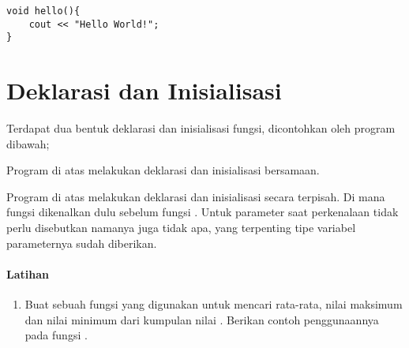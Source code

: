 \documentclass[../main.tex]{subfiles}
\begin{document}
\begin{verbatim}
void hello(){
	cout << "Hello World!";
}
\end{verbatim}

\section{Deklarasi dan Inisialisasi}
Terdapat dua bentuk deklarasi dan inisialisasi fungsi, dicontohkan oleh program
dibawah;


Program di atas melakukan deklarasi dan inisialisasi bersamaan.


Program di atas melakukan deklarasi dan inisialisasi secara terpisah. Di mana
fungsi dikenalkan dulu sebelum fungsi . Untuk parameter saat
perkenalaan tidak perlu disebutkan namanya juga tidak apa, yang terpenting tipe
variabel parameternya sudah diberikan.

\paragraph{Latihan}
\begin{enumerate}
	\item Buat sebuah fungsi yang digunakan untuk mencari rata-rata, nilai
	maksimum dan nilai minimum dari kumpulan nilai . Berikan
	contoh penggunaannya pada fungsi .
\end{enumerate}
\end{document}
